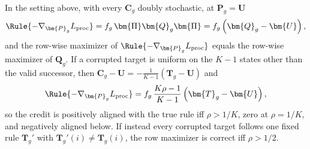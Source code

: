 \begin{proposition}
\label{prop:noisy-process-credit}
In the setting above, with every $\bm{C}_g$ doubly stochastic, at $\bm{P}_g=\bm{U}$
\begin{equation}
 \Rule{-\nabla_{\bm{P}_g}L_{\rm proc}}
 =f_g\,\bm{\Pi} \bm{Q}_g\bm{\Pi}
 =f_g\left(\bm{Q}_g-\bm{U}\right),
 \label{eq:noisy-credit-proof}
\end{equation}
and the row-wise maximizer of $\Rule{-\nabla_{\bm{P}_g}L_{\rm proc}}$ equals the
row-wise maximizer of $\bm{Q}_g$.  If a corrupted target is uniform on the $K-1$
states other than the valid successor, then
$\bm{C}_g-\bm{U}=-\frac{1}{K-1}(\bm{T}_g-\bm{U})$ and
\begin{equation}
 \Rule{-\nabla_{\bm{P}_g}L_{\rm proc}}
 =f_g\,\frac{K\rho-1}{K-1}\left(\bm{T}_g-\bm{U}\right),
 \label{eq:symmetric-credit-proof}
\end{equation}
so the credit is positively aligned with the true rule iff $\rho>1/K$, zero at
$\rho=1/K$, and negatively aligned below.  If instead every corrupted target
follows one fixed rule $\bm{T}_g'$ with $\bm{T}_g'(i)\ne \bm{T}_g(i)$, the row maximizer is
correct iff $\rho>1/2$.
\end{proposition}

